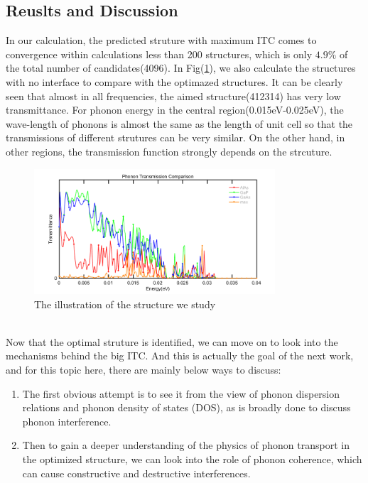 \subsection{Reuslts and Discussion}
In our calculation, the predicted struture with maximum ITC comes to convergence within calculations less than 200 structures, which is only $4.9\%$ of the total number of candidates(4096). In Fig(\ref{fig:maxITC}), we also calculate the structures with no interface to compare with the optimazed structures. It can be clearly seen that almost in all frequencies, the aimed structure(412314) has very low transmittance. For phonon energy in the central region(0.015eV-0.025eV), the wave-length of phonons is almost the same as the length of unit cell so that the transmissions of different strutures can be very similar. On the other hand, in other regions, the transmission function strongly depends on the strcuture.
\begin{figure}
\centering
\includegraphics[width=0.8\textwidth]{max.png}
\caption{The illustration of the structure we study}
\label{fig:maxITC}
\end{figure}\\
\indent Now that the optimal struture is identified, we can move on  to look into the mechanisms behind the big ITC. And this is actually the goal of the next work, and for this topic here, there are mainly below ways to discuss:
\begin{enumerate}
	\item The first
obvious attempt is to see it from the view of phonon
dispersion relations and phonon density of states (DOS), as
is broadly done to discuss phonon interference.
	\item Then to gain a deeper understanding of the physics of
phonon transport in the optimized structure, we can look into
the role of phonon coherence, which can cause constructive
and destructive interferences.
\end{enumerate}
